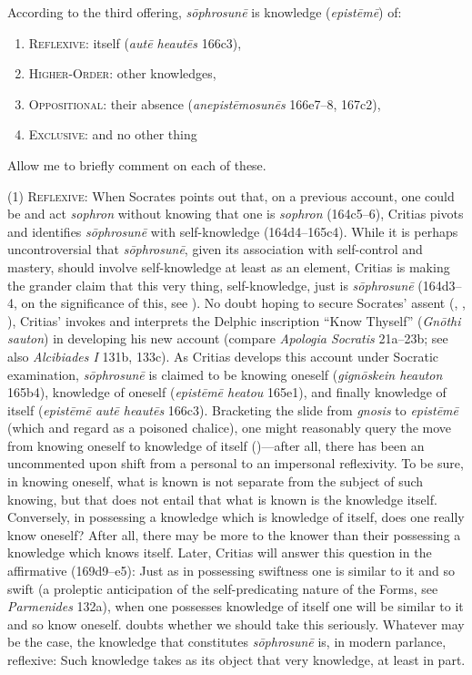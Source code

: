 According to the third offering, \emph{sōphrosunē} is knowledge (\emph{epistēmē}) of:
\begin{enumerate}[(1)]
	\item \textsc{Reflexive}: itself (\emph{autē heautēs} 166c3),
	\item \textsc{Higher-Order}: other knowledges,
	\item \textsc{Oppositional}: their absence (\emph{anepistēmosunēs} 166e7–8, 167c2),
	\item \textsc{Exclusive}: and no other thing
\end{enumerate}

Allow me to briefly comment on each of these.

(1) \textsc{Reflexive}: When Socrates points out that, on a previous account, one could be and act \emph{sophron} without knowing that one is \emph{sophron} (164c5–6), Critias pivots and identifies \emph{sōphrosunē} with self-knowledge (164d4–165c4). While it is perhaps uncontroversial that \emph{sōphrosunē}, given its association with self-control and mastery, should involve self-knowledge at least as an element, Critias is making the grander claim that this very thing, self-knowledge, just is \emph{sōphrosunē} (164d3–4, on the significance of this, see \citealt{Kosman:2014aa}). No doubt hoping to secure Socrates' assent (\citealt[23–4]{Tuckey:1951aa}, \citealt[81]{Hyland:1981aa}, \citealt[161–2]{Tsouna:2022aa}), Critias' invokes and interprets the Delphic inscription ``Know Thyself'' (\emph{Gnōthi sauton}) in developing his new account (compare \emph{Apologia Socratis} 21a–23b; see also \emph{Alcibiades I} 131b, 133c). As Critias develops this account under Socratic examination, \emph{sōphrosunē} is claimed to be knowing oneself (\emph{gignōskein heauton} 165b4), knowledge of oneself (\emph{epistēmē heatou} 165e1), and finally knowledge of itself (\emph{epistēmē autē heautēs} 166c3). Bracketing the slide from \emph{gnosis} to \emph{epistēmē} (which \citealt{Hyland:1981aa} and \citealt{Schmid:1998aa} regard as a poisoned chalice), one might reasonably query the move from knowing oneself to knowledge of itself (\citealt[33–7, 107–8]{Tuckey:1951aa})—after all, there has been an uncommented upon shift from a personal to an impersonal reflexivity. To be sure, in knowing oneself, what is known is not separate from the subject of such knowing, but that does not entail that what is known is the knowledge itself. Conversely, in possessing a knowledge which is knowledge of itself, does one really know oneself? After all, there may be more to the knower than their possessing a knowledge which knows itself. Later, Critias will answer this question in the affirmative (169d9–e5): Just as in possessing swiftness one is similar to it and so swift (a proleptic anticipation of the self-predicating nature of the Forms, see \emph{Parmenides} 132a), when one possesses knowledge of itself one will be similar to it and so know oneself. \citet{Kosman:2014aa} doubts whether we should take this seriously. Whatever may be the case, the knowledge that constitutes \emph{sōphrosunē} is, in modern parlance, reflexive: Such knowledge takes as its object that very knowledge, at least in part.

